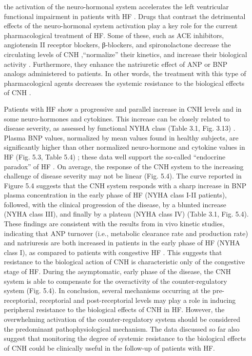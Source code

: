 \documentclass[14pt,a4paper,onecolumn]{extarticle}
\begin{document}
the activation of the neuro-hormonal system accelerates the left ventricular functional impairment in patients with HF \citep{bib31} \citep{bib32} \citep{bib33} \citep{bib34} \citep{bib35} \citep{bib36} \citep{bib358} \citep{bib359} \citep{bib360}. Drugs that contrast the detrimental
effects of the neuro-hormonal system activation play a key role for the current pharmacological treatment of HF. Some of these, such as ACE inhibitors, angiotensin II
receptor blockers, β-blockers, and spironolactone decrease the circulating levels of CNH
\citep{bib35} \citep{bib361} \citep{bib362} \citep{bib363} \citep{bib364} \citep{bib365},“normalize” their kinetics, and increase their biological activity \citep{bib324} \citep{bib326}. Furthermore, they enhance the natriuretic effect of ANP or BNP analogs administered to
patients. In other words, the treatment with this type of pharmacological agents decreases the systemic resistance to the biological effects of CNH \citep{bib324} \citep{bib326}.

Patients with HF show a progressive and parallel increase in CNH levels and in some
neuro-hormones and cytokines. This increase can be closely related to disease severity, as assessed by functional NYHA class (Table 3.1, Fig. 3.13) \citep{bib360}. Plasma BNP values,
normalized by mean values found in healthy subjects, are significantly higher than
other normalized neuro-hormone and cytokine values in HF (Fig. 5.3, Table 5.4) \citep{bib360};
these data well support the so-called “endocrine paradox” of HF \citep{bib36}. On average, the
response of the CNH system to the increasing challenge of disease severity may not be
linear (Fig. 5.4). The curve reported in Figure 5.4 suggests that the CNH system responds
with a sharp increase in BNP plasma concentration in the early phase of HF (NYHA
class I-II patients), followed, with the clinical progression of the disease, by a blunted
increase (NYHA class III), and finally by a plateau (NYHA class IV) (Table 3.1, Fig. 5.4).
These findings are consistent with the results from in vivo kinetic studies, indicating
that ANP turnover (i.e., metabolic clearance rate and production rate) and natriuresis
are both increased in patients in the early phase of HF (NYHA class I), as compared to
patients with congestive HF \citep{bib324} \citep{bib326}. This suggests that resistance to the biological
action of CNH is characteristic only of the congestive stage of HF. During the asymptomatic, early phase of the disease, the CNH system is able to compensate for the overactivity of the counter-regulatory system (Fig. 5.4).
In conclusion, several mechanisms occurring at the pre-receptorial, receptorial and
post-receptorial levels may play a role in inducing peripheral resistance to the biological
effects of CNH in HF. However, the overwhelming activation of the counter-regulatory
system should be considered the predominant pathophysiological mechanism. The data
discussed so far also suggest that monitoring the degree of systemic resistance to the biological effects of CNH could be clinically useful in the follow-up of patients with HF.
\end{document}
